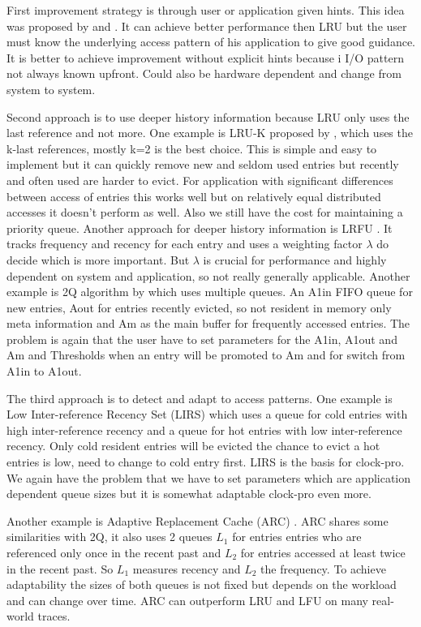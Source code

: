 \documentclass[
	12pt,
	a4paper,
	abstract,
	bibliography=totoc,
	chapterprefix,
	headings=openright,
	numbers=endperiod,
	parskip=half,
	twoside,
]{scrreprt}
\begin{document}
First improvement strategy is through user or application given hints.
This idea was proposed by \cite{cao1994application} and \cite{patterson1995informed}.
It can achieve better performance then LRU but the user must know the underlying access pattern of his application to give good guidance.
It is better to achieve improvement without explicit hints because i
I/O pattern not always known upfront.
Could also be hardware dependent and change from system to system.

Second approach is to use deeper history information because LRU only uses the last reference and not more.
One example is LRU-K proposed by \cite{o1993lru},
which uses the k-last references, mostly k=2 is the best choice.
This is simple and easy to implement but it can quickly remove new and seldom used entries but recently and often used are harder to evict.
For application with significant differences between access of entries this works well but on relatively equal distributed accesses it doesn't perform as well.
Also we still have the cost for maintaining a priority queue.
Another approach for  deeper history information is LRFU \cite{lee2001lrfu}. 
It tracks frequency and recency for each entry and uses a weighting factor $\lambda$ do decide which is more important.
But $\lambda$ is crucial for performance and highly dependent on system and application,
so not really generally applicable.
Another example is 2Q  algorithm by \cite{shasha19942q} which uses multiple queues.
An A1in FIFO queue for new entries, Aout for entries recently evicted, so not resident in memory only meta information and Am as the main buffer for frequently accessed entries.
The problem is again that the user have to set parameters for the A1in, A1out and Am and Thresholds when an entry will be promoted to Am and for switch from A1in to A1out.

The third approach is to detect and adapt to access patterns.
One example is Low Inter-reference Recency Set (LIRS) \cite{10.1145/511399.511340} which uses a queue for cold entries with high inter-reference recency and a queue for hot entries with low inter-reference recency.
Only cold resident entries will be evicted the chance to evict a hot entries is low, need to change to cold entry first.
LIRS is the basis for clock-pro.
We again have the problem that we have to set parameters which are application dependent queue sizes but it is somewhat adaptable clock-pro even more.

Another example is Adaptive Replacement Cache (ARC) \cite{270366}.
ARC shares some similarities with 2Q, it also uses 2 queues $L_1$ for entries entries who are referenced only once in the recent past and $L_2$ for entries accessed at least twice in the recent past.
So  $L_1$ measures recency and $L_2$ the frequency.
To achieve adaptability the sizes of both queues is not fixed but depends on the workload and can change over time.
ARC can outperform LRU and LFU on many real-world traces.
\end{document}
